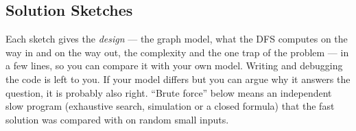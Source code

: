 \subsection{Solution Sketches}
\label{ssec:ch2-sketches}

\begin{warningbox}
Each sketch gives the \emph{design} --- the graph model, what the DFS computes on the way in and on the way out, the complexity and the one trap of the problem --- in a few lines, so you can compare it with your own model. Writing and debugging the code is left to you. If your model differs but you can argue why it answers the question, it is probably also right. ``Brute force'' below means an independent slow program (exhaustive search, simulation or a closed formula) that the fast solution was compared with on random small inputs.
\end{warningbox}

\begingroup
\providecommand{\sk}{}
\renewcommand{\sk}[2]{\par\smallskip\noindent\textbf{\textcolor{deepblue}{#1}}\quad #2\par}

